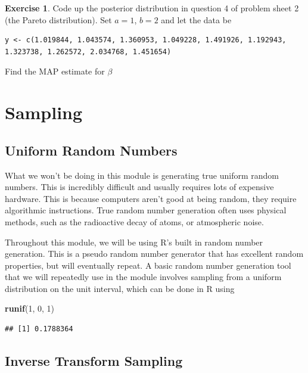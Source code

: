 \documentclass[
]{book}
\newenvironment{Shaded}{\begin{snugshade}}{\end{snugshade}}
\newcommand{\DecValTok}[1]{\textcolor[rgb]{0.00,0.00,0.81}{#1}}
\newcommand{\FunctionTok}[1]{\textcolor[rgb]{0.13,0.29,0.53}{\textbf{#1}}}
\newcommand{\NormalTok}[1]{#1}
\theoremstyle{definition}
\theoremstyle{definition}
\theoremstyle{definition}
\newtheorem{exercise}{Exercise}[chapter]
\theoremstyle{definition}
\theoremstyle{remark}
\begin{document}
\begin{exercise}
Code up the posterior distribution in question 4 of problem sheet 2 (the Pareto distribution). Set \(a = 1\), \(b = 2\) and let the data be

\begin{verbatim}
y <- c(1.019844, 1.043574, 1.360953, 1.049228, 1.491926, 1.192943, 1.323738, 1.262572, 2.034768, 1.451654)
\end{verbatim}

Find the MAP estimate for \(\beta\)
\end{exercise}

\hypertarget{sampling}{%
\chapter{Sampling}\label{sampling}}

\hypertarget{uniform-random-numbers}{%
\section{Uniform Random Numbers}\label{uniform-random-numbers}}

What we won't be doing in this module is generating true uniform random numbers. This is incredibly difficult and usually requires lots of expensive hardware. This is because computers aren't good at being random, they require algorithmic instructions. True random number generation often uses physical methods, such as the radioactive decay of atoms, or atmospheric noise.

Throughout this module, we will be using R's built in random number generation. This is a pseudo random number generator that has excellent random properties, but will eventually repeat. A basic random number generation tool that we will repeatedly use in the module involves sampling from a uniform distribution on the unit interval, which can be done in R using

\begin{Shaded}
\begin{Highlighting}[]
\FunctionTok{runif}\NormalTok{(}\DecValTok{1}\NormalTok{, }\DecValTok{0}\NormalTok{, }\DecValTok{1}\NormalTok{)}
\end{Highlighting}
\end{Shaded}

\begin{verbatim}
## [1] 0.1788364
\end{verbatim}

\hypertarget{inverse-transform-sampling}{%
\section{Inverse Transform Sampling}\label{inverse-transform-sampling}}
\end{document}
